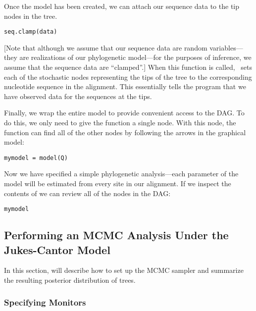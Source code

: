 Once the  model has been created, we can attach our sequence data to the tip nodes in the tree.
{\tt \begin{snugshade*}
\begin{lstlisting}
seq.clamp(data)
\end{lstlisting}
\end{snugshade*}}
[Note that although we assume that our sequence data are random variables---they are realizations of our phylogenetic model---for the purposes of inference, we assume that the sequence data are ``clamped''.]
When this function is called, \RevBayes~sets each of the stochastic nodes representing the tips of the tree to the corresponding nucleotide sequence in the alignment. 
This essentially tells the program that we have observed data for the sequences at the tips. 

Finally, we wrap the entire model to provide convenient access to the DAG. 
To do this, we only need to give the  function a single node. 
With this node, the  function can find all of the other nodes by following the arrows in the graphical model:
{\tt \begin{snugshade*}
\begin{lstlisting}
mymodel = model(Q)
\end{lstlisting}
\end{snugshade*}}

Now we have specified a simple phylogenetic analysis---each parameter of the model will be estimated from every site in our alignment.
If we inspect the contents of  we can review all of the nodes in the DAG:
{\tt \begin{snugshade*}
\begin{lstlisting}
mymodel
\end{lstlisting}
\end{snugshade*}}

\bigskip
\subsection{Performing an MCMC Analysis Under the Jukes-Cantor Model}

In this section, will describe how to set up the MCMC sampler and summarize the resulting posterior distribution of trees. 

\subsubsection{Specifying Monitors}

